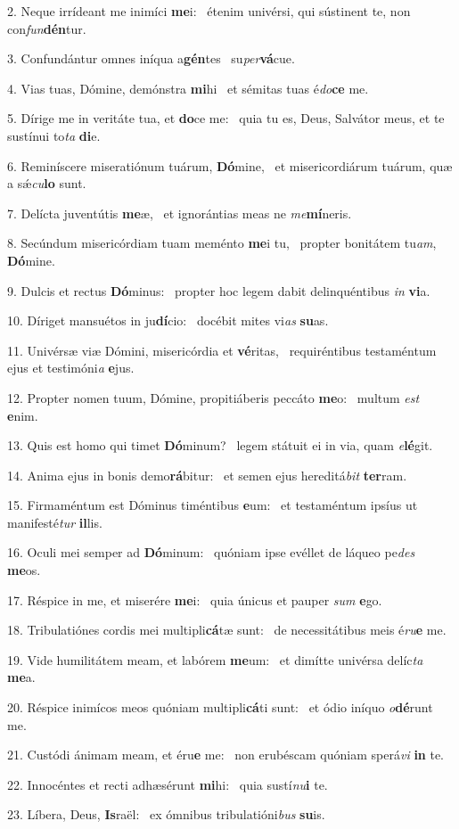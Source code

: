 2. Neque irrídeant me inimíci \textbf{me}i: \ast\  étenim univérsi, qui sústinent te, non con\textit{fun}\textbf{dén}tur.\

3. Confundántur omnes iníqua a\textbf{gén}tes \ast\  su\textit{per}\textbf{vá}cue.\

4. Vias tuas, Dómine, demónstra \textbf{mi}hi \ast\  et sémitas tuas é\textit{do}\textbf{ce} me.\

5. Dírige me in veritáte tua, et \textbf{do}ce me: \ast\  quia tu es, Deus, Salvátor meus, et te sustínui to\textit{ta} \textbf{di}e.\

6. Reminíscere miseratiónum tuárum, \textbf{Dó}mine, \ast\  et misericordiárum tuárum, quæ a sǽ\textit{cu}\textbf{lo} sunt.\

7. Delícta juventútis \textbf{me}æ, \ast\  et ignorántias meas ne \textit{me}\textbf{mí}neris.\

8. Secúndum misericórdiam tuam meménto \textbf{me}i tu, \ast\  propter bonitátem tu\textit{am}, \textbf{Dó}mine.\

9. Dulcis et rectus \textbf{Dó}minus: \ast\  propter hoc legem dabit delinquéntibus \textit{in} \textbf{vi}a.\

10. Díriget mansuétos in ju\textbf{dí}cio: \ast\  docébit mites vi\textit{as} \textbf{su}as.\

11. Univérsæ viæ Dómini, misericórdia et \textbf{vé}ritas, \ast\  requiréntibus testaméntum ejus et testimóni\textit{a} \textbf{e}jus.\

12. Propter nomen tuum, Dómine, propitiáberis peccáto \textbf{me}o: \ast\  multum \textit{est} \textbf{e}nim.\

13. Quis est homo qui timet \textbf{Dó}minum? \ast\  legem státuit ei in via, quam \textit{e}\textbf{lé}git.\

14. Anima ejus in bonis demo\textbf{rá}bitur: \ast\  et semen ejus hereditá\textit{bit} \textbf{ter}ram.\

15. Firmaméntum est Dóminus timéntibus \textbf{e}um: \ast\  et testaméntum ipsíus ut manifesté\textit{tur} \textbf{il}lis.\

16. Oculi mei semper ad \textbf{Dó}minum: \ast\  quóniam ipse evéllet de láqueo pe\textit{des} \textbf{me}os.\

17. Réspice in me, et miserére \textbf{me}i: \ast\  quia únicus et pauper \textit{sum} \textbf{e}go.\

18. Tribulatiónes cordis mei multipli\textbf{cá}tæ sunt: \ast\  de necessitátibus meis é\textit{ru}\textbf{e} me.\

19. Vide humilitátem meam, et labórem \textbf{me}um: \ast\  et dimítte univérsa delíc\textit{ta} \textbf{me}a.\

20. Réspice inimícos meos quóniam multipli\textbf{cá}ti sunt: \ast\  et ódio iníquo \textit{o}\textbf{dé}runt me.\

21. Custódi ánimam meam, et éru\textbf{e} me: \ast\  non erubéscam quóniam sperá\textit{vi} \textbf{in} te.\

22. Innocéntes et recti adhæsérunt \textbf{mi}hi: \ast\  quia sustí\textit{nu}\textbf{i} te.\

23. Líbera, Deus, \textbf{Is}raël: \ast\  ex ómnibus tribulatióni\textit{bus} \textbf{su}is.\

